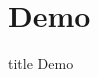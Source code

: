 \documentclass{beamer}
\begin{document}
	
	
	\section{Demo}
	
	
		\begin{frame}
                \vfill
                \centering
                \begin{beamercolorbox}[sep=8pt,center,shadow=true,rounded=true]{title}
                    Demo\par%
                \end{beamercolorbox}
                \vfill
        \end{frame}
    	
    	
    		
    		
		
            
        
   	
\end{document}
